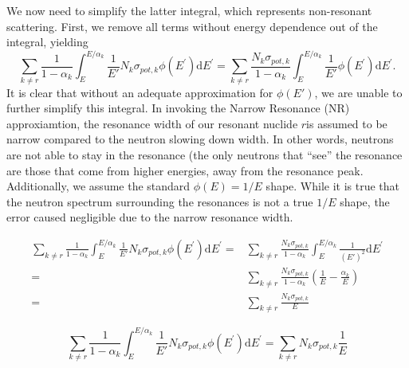 \documentclass[10pt]{article}
\begin{document}
We now need to simplify the latter integral, which represents non-resonant scattering. First, we remove all terms without energy dependence out of the integral, yielding
\begin{equation}\sum\limits_{k\neq r}\frac{1}{1-\alpha_{k}}\int_{E}^{E/\alpha_{k}}\frac{1}{E'}N_{k}\sigma_{pot,k}\phi\left(E^{\prime}\right)\mathrm{d}E^{\prime}=\sum\limits_{k\neq r}\frac{N_{k}\sigma_{pot,k}}{1-\alpha_{k}}\int_{E}^{E/\alpha_{k}}\frac{1}{E'}\phi\left(E^{\prime}\right)\mathrm{d}E^{\prime}.\end{equation}
It is clear that without an adequate approximation for $\phi(E')$, we are unable to further simplify this integral. In invoking the Narrow Resonance (NR) approxiamtion, the resonance width of our resonant nuclide $r$is assumed to be narrow compared to the neutron slowing down width. In other words, neutrons are not able to stay in the resonance (the only neutrons that ``see'' the resonance are those that come from higher energies, away from the resonance peak. Additionally, we assume the standard $\phi(E)=1/E$ shape. While it is true that the neutron spectrum surrounding the resonances is not a true $1/E$ shape, the error caused negligible due to the narrow resonance width.


\begin{align}
  \sum\limits_{k\neq r}\frac{1}{1-\alpha_{k}}\int_{E}^{E/\alpha_{k}}\frac{1}{E'}N_{k}\sigma_{pot,k}\phi\left(E^{\prime}\right)\mathrm{d}E^{\prime} = &\sum\limits_{k\neq r}\frac{N_{k}\sigma_{pot,k}}{1-\alpha_{k}}\int_{E}^{E/\alpha_{k}}\frac{1}{(E')^2}\mathrm{d}E^{\prime}\\
  = &\sum\limits_{k\neq r}\frac{N_{k}\sigma_{pot,k}}{1-\alpha_{k}}\left(\frac{1}{E}-\frac{\alpha_k}{E}\right)\\
  = &\sum\limits_{k\neq r}\frac{N_{k}\sigma_{pot,k}}{E}
\end{align}



\begin{equation}\boxed{\sum\limits_{k\neq r}\frac{1}{1-\alpha_{k}}\int_{E}^{E/\alpha_{k}}\frac{1}{E'}N_{k}\sigma_{pot,k}\phi\left(E^{\prime}\right)\mathrm{d}E^{\prime}=\sum\limits_{k\neq r}N_{k}\sigma_{pot,k}\frac{1}{E}}\label{eq:NR-mainConclusion1}\end{equation}
\end{document}
